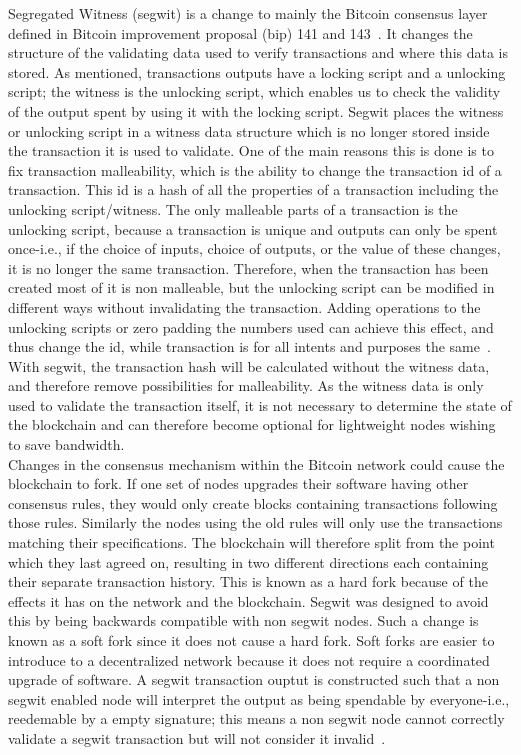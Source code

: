 Segregated Witness (segwit) is a change to mainly the Bitcoin consensus layer defined in Bitcoin improvement proposal (bip) 141 and 143~\cite{BIP141,BIP143}. It changes the structure of the validating data used to verify transactions and where this data is stored. As mentioned, transactions outputs have a locking script and a unlocking script; the witness is the unlocking script, which enables us to check the validity of the output spent by using it with the locking script. Segwit places the witness or unlocking script in a witness data structure which is no longer stored inside the transaction it is used to validate. One of the main reasons this is done is to fix transaction malleability, which is the ability to change the transaction id of a transaction. This id is a hash of all the properties of a transaction including the unlocking script/witness. The only malleable parts of a transaction is the unlocking script, because a transaction is unique and outputs can only be spent once-i.e., if the choice of inputs, choice of outputs, or the value of these changes, it is no longer the same transaction.
Therefore, when the transaction has been created most of it is non malleable, but the unlocking script can be modified in different ways without invalidating the transaction. Adding operations to the unlocking scripts or zero padding the numbers used can achieve this effect, and thus change the id, while transaction is for all intents and purposes the same~\cite{BIP62}. With segwit, the transaction hash will be calculated without the witness data, and therefore remove possibilities for malleability. As the witness data is only used to validate the transaction itself, it is not necessary to determine the state of the blockchain and can therefore become optional for lightweight nodes wishing to save bandwidth. 
\\

Changes in the consensus mechanism within the Bitcoin network could cause the blockchain to fork. If one set of nodes upgrades their software having other consensus rules, they would only create blocks containing transactions following those rules. Similarly the nodes using the old rules will only use the transactions matching their specifications. The blockchain will therefore split from the point which they last agreed on, resulting in two different directions each containing their separate transaction history. This is known as a hard fork because of the effects it has on the network and the blockchain. Segwit was designed to avoid this by being backwards compatible with non segwit nodes. Such a change is known as a soft fork since it does not cause a hard fork. Soft forks are easier to introduce to a decentralized network because it does not require a coordinated upgrade of software. A segwit transaction ouptut is constructed such that a non segwit enabled node will interpret the output as being spendable by everyone-i.e., reedemable by a empty signature; this means a non segwit node cannot correctly validate a segwit transaction but will not consider it invalid~\cite{antonopoulos2017mastering}. 
\\

